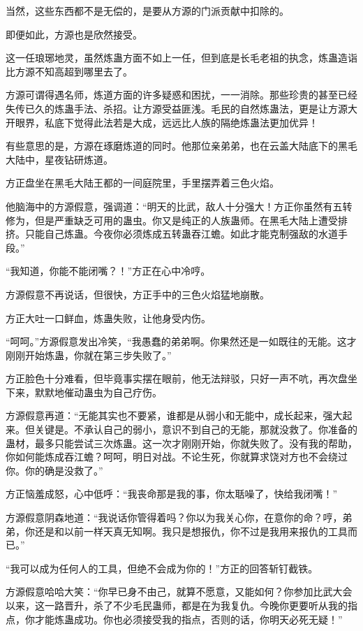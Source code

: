 \begin{this_body}
当然，这些东西都不是无偿的，是要从方源的门派贡献中扣除的。

即便如此，方源也是欣然接受。

这一任琅琊地灵，虽然炼蛊方面不如上一任，但到底是长毛老祖的执念，炼蛊造诣比方源不知高超到哪里去了。

方源可谓得遇名师，炼道方面的许多疑惑和困扰，一一消除。那些珍贵的甚至已经失传已久的炼蛊手法、杀招。让方源受益匪浅。毛民的自然炼蛊法，更是让方源大开眼界，私底下觉得此法若是大成，远远比人族的隔绝炼蛊法更加优异！

有些意思的是，方源在琢磨炼道的同时。他那位亲弟弟，也在云盖大陆底下的黑毛大陆中，星夜钻研炼道。

方正盘坐在黑毛大陆王都的一间庭院里，手里摆弄着三色火焰。

他脑海中的方源假意，强调道：“明天的比武，敌人十分强大！方正你虽然有五转修为，但是严重缺乏可用的蛊虫。你又是纯正的人族蛊师。在黑毛大陆上遭受排挤。只能自己炼蛊。今夜你必须炼成五转蛊吞江蟾。如此才能克制强敌的水道手段。”

“我知道，你能不能闭嘴？！”方正在心中冷哼。

方源假意不再说话，但很快，方正手中的三色火焰猛地崩散。

方正大吐一口鲜血，炼蛊失败，让他身受内伤。

“呵呵。”方源假意发出冷笑，“我愚蠢的弟弟啊。你果然还是一如既往的无能。这才刚刚开始炼蛊，你就在第三步失败了。”

方正脸色十分难看，但毕竟事实摆在眼前，他无法辩驳，只好一声不吭，再次盘坐下来，默默地催动蛊虫为自己疗伤。

方源假意再道：“无能其实也不要紧，谁都是从弱小和无能中，成长起来，强大起来。但关键是。不承认自己的弱小，意识不到自己的无能，那就没救了。你准备的蛊材，最多只能尝试三次炼蛊。这一次才刚刚开始，你就失败了。没有我的帮助，你如何能炼成吞江蟾？呵呵，明日对战。不论生死，你就算求饶对方也不会绕过你。你的确是没救了。”

方正恼羞成怒，心中低呼：“我丧命那是我的事，你太聒噪了，快给我闭嘴！”

方源假意阴森地道：“我说话你管得着吗？你以为我关心你，在意你的命？哼，弟弟，你还是和以前一样天真无知啊。我只是想报仇，你不过是我用来报仇的工具而已。”

“我可以成为任何人的工具，但绝不会成为你的！”方正的回答斩钉截铁。

方源假意哈哈大笑：“你早已身不由己，就算不愿意，又能如何？你参加比武大会以来，这一路晋升，杀了不少毛民蛊师，都是在为我复仇。今晚你更要听从我的指点，你才能炼蛊成功。你也必须接受我的指点，否则的话，你明天必死无疑！”


\end{this_body}
